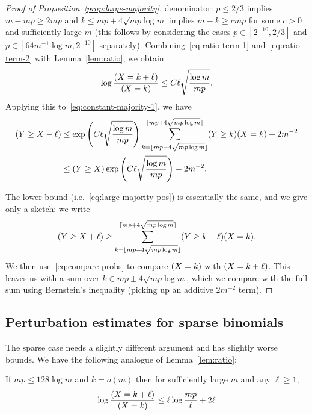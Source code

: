 \documentclass[EJP,final]{ejpecp}
\newcommand{\1}[1]{\mathbbm{1}_{\{#1\}}}
\let\Pr\relax
\DeclareMathOperator{\Pr}{Pr}
\begin{document}
\begin{proof}[Proof of Proposition~\ref{prop:large-majority}]
 denominator: $p \le 2/3$ implies
 $m - mp \ge 2mp$ and $k \le mp + 4 \sqrt{mp \log m}$ implies
 $m - k \ge cmp$  for some $c > 0$ and sufficiently large $m$
 (this follows by considering the cases $p \in [2^{-10}, 2/3]$ and
 $p \in [64 m^{-1} \log m, 2^{-10}]$ separately).
 Combining~\eqref{eq:ratio-term-1} and~\eqref{eq:ratio-term-2}
 with Lemma~\ref{lem:ratio}, we obtain
 \begin{equation}\label{eq:compare-probs}
  \log \frac{\Pr(X = k+\ell)}{\Pr(X = k)}
  \le C \ell \sqrt{\frac{\log m}{mp}}.
 \end{equation}
 Applying this to~\eqref{eq:constant-majority-1}, we have
 \begin{align*}
  \Pr(Y \ge X - \ell)
  &\le \exp\left(C \ell \sqrt{\frac{\log m}{mp}} \right)
      \sum_{k=\lfloor mp - 4 \sqrt{mp \log m}\rfloor}
	  ^{\lceil mp + 4 \sqrt{mp \log m}\rceil}
	  \Pr(Y \ge k) \Pr(X = k) + 2m^{-2} \\
  &\le \Pr(Y \ge X) \exp\left(C \ell \sqrt{\frac{\log m}{mp}}\right) + 2m^{-2}.
 \end{align*}

 The lower bound (i.e.~\eqref{eq:large-majority-pos})
 is essentially the same, and we give only a sketch: we write
 \begin{align*}
   \Pr(Y \ge X + \ell) \ge \sum_{k=\lfloor mp - 4 \sqrt{mp \log m}\rfloor}^{\lceil mp + 4 \sqrt{mp \log m}\rceil}
   \Pr(Y \ge k + \ell) \Pr(X = k).
 \end{align*}
 We then use~\eqref{eq:compare-probs} to compare $\Pr(X = k)$ with
 $\Pr(X = k + \ell)$. This leaves us with a sum over $k \in mp \pm 4 \sqrt{mp \log m}$,
 which we compare with the full sum using Bernstein's inequality (picking up
 an additive $2m^{-2}$ term).
\end{proof}


\subsection{Perturbation estimates for sparse binomials}

The sparse case needs a slightly different argument and
has slightly worse bounds. We have the following analogue
of Lemma~\ref{lem:ratio}:

\begin{lemma}\label{lem:ratio-sparse}
 If $mp \le 128 \log m$ and $k = o(m)$ then for sufficiently large $m$ and any $\ell \ge 1$,
 \[
  \log \frac {\Pr(X = k + \ell)}{\Pr(X = k)}
  \le \ell \log \frac{mp}{\ell} + 2\ell
 \]
\end{lemma}
\end{document}
